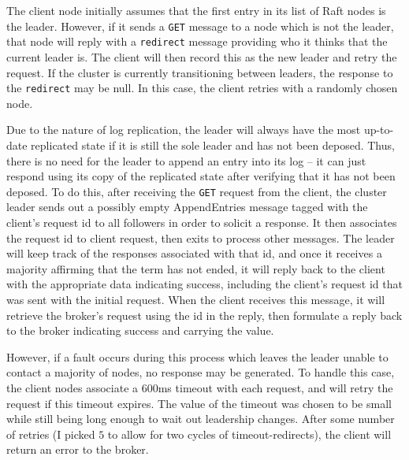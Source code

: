\documentclass[psamsfonts]{amsart}
\begin{document}
The client node initially assumes that the first entry in its list of Raft nodes is the leader. However, if it sends a \verb|GET| message to a node which is not the leader, that node will reply with a \verb|redirect| message providing who it thinks that the current leader is. The client will then record this as the new leader and retry the request. If the cluster is currently transitioning between leaders, the response to the \verb|redirect| may be null. In this case, the client retries with a randomly chosen node.

Due to the nature of log replication, the leader will always have the most up-to-date replicated state if it is still the sole leader and has not been deposed. Thus, there is no need for the leader to append an entry into its log -- it can just respond using its copy of the replicated state after verifying that it has not been deposed. To do this, after receiving the \verb|GET| request from the client, the cluster leader sends out a possibly empty AppendEntries message tagged with the client's request id to all followers in order to solicit a response. It then associates the request id to client request, then exits to process other messages. The leader will keep track of the responses associated with that id, and once it receives a majority affirming that the term has not ended, it will reply back to the client with the appropriate data indicating success, including the client's request id that was sent with the initial request. When the client receives this message, it will retrieve the broker's request using the id in the reply, then formulate a reply back to the broker indicating success and carrying the value.

However, if a fault occurs during this process which leaves the leader unable to contact a majority of nodes, no response may be generated. To handle this case, the client nodes associate a $600$ms timeout with each request, and will retry the request if this timeout expires. The value of the timeout was chosen to be small while still being long enough to wait out leadership changes. After some number of retries (I picked $5$ to allow for two cycles of timeout-redirects), the client will return an error to the broker. 
\end{document}
